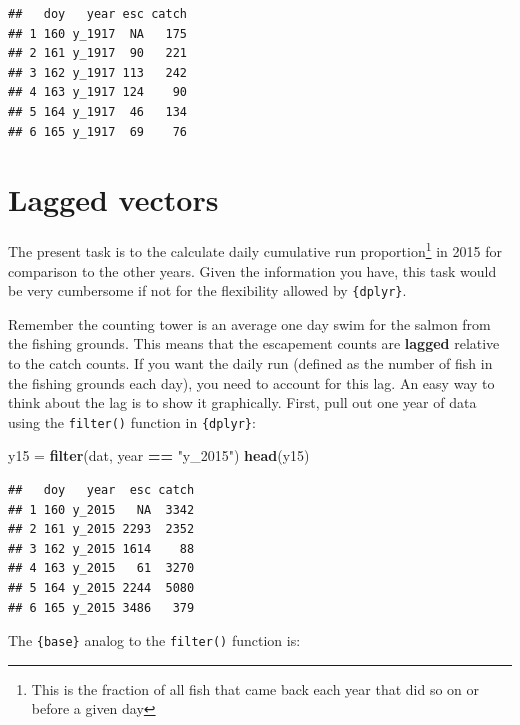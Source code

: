 \documentclass[]{book}
\newenvironment{Shaded}{\begin{snugshade}}{\end{snugshade}}
\newcommand{\KeywordTok}[1]{\textcolor[rgb]{0.13,0.29,0.53}{\textbf{#1}}}
\newcommand{\StringTok}[1]{\textcolor[rgb]{0.31,0.60,0.02}{#1}}
\newcommand{\CommentTok}[1]{\textcolor[rgb]{0.56,0.35,0.01}{\textit{#1}}}
\newcommand{\OperatorTok}[1]{\textcolor[rgb]{0.81,0.36,0.00}{\textbf{#1}}}
\newcommand{\NormalTok}[1]{#1}
\let\rmarkdownfootnote\footnote%
\def\footnote{\protect\rmarkdownfootnote}
\theoremstyle{definition}
\theoremstyle{definition}
\theoremstyle{definition}
\theoremstyle{remark}
\begin{document}
\begin{verbatim}
##   doy   year esc catch
## 1 160 y_1917  NA   175
## 2 161 y_1917  90   221
## 3 162 y_1917 113   242
## 4 163 y_1917 124    90
## 5 164 y_1917  46   134
## 6 165 y_1917  69    76
\end{verbatim}

\section{Lagged vectors}\label{lagged-vectors}

The present task is to the calculate daily cumulative run
proportion\footnote{This is the fraction of all fish that came back each
  year that did so on or before a given day} in 2015 for comparison to
the other years. Given the information you have, this task would be very
cumbersome if not for the flexibility allowed by \texttt{\{dplyr\}}.

Remember the counting tower is an average one day swim for the salmon
from the fishing grounds. This means that the escapement counts are
\textbf{lagged} relative to the catch counts. If you want the daily run
(defined as the number of fish in the fishing grounds each day), you
need to account for this lag. An easy way to think about the lag is to
show it graphically. First, pull out one year of data using the
\texttt{filter()} function in \texttt{\{dplyr\}}:

\begin{Shaded}
\begin{Highlighting}[]
\NormalTok{y15 =}\StringTok{ }\KeywordTok{filter}\NormalTok{(dat, year }\OperatorTok{==}\StringTok{ "y_2015"}\NormalTok{)}
\KeywordTok{head}\NormalTok{(y15)}
\end{Highlighting}
\end{Shaded}

\begin{verbatim}
##   doy   year  esc catch
## 1 160 y_2015   NA  3342
## 2 161 y_2015 2293  2352
## 3 162 y_2015 1614    88
## 4 163 y_2015   61  3270
## 5 164 y_2015 2244  5080
## 6 165 y_2015 3486   379
\end{verbatim}

The \texttt{\{base\}} analog to the \texttt{filter()} function is:

\begin{Shaded}
\end{Shaded}
\end{document}
